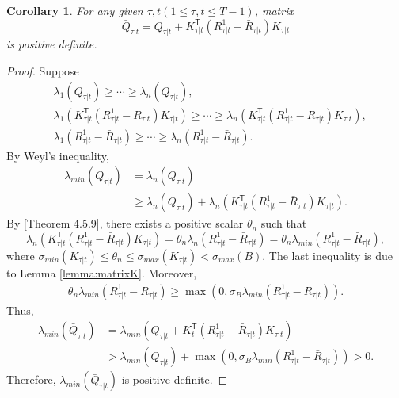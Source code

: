 \documentclass{article}
\newcommand{\transpose}{\mathsf{T}}
\newtheorem{corollary}{Corollary}
\begin{document}
\begin{corollary}
    For any given $\tau,t(1\leq \tau, t \leq T-1)$, matrix
    \begin{equation}
        \bar{Q}_{\tau|t} = Q_{\tau|t} + K_{\tau|t}^{\transpose}(R_{\tau|t}^{1} - \bar{R}_{\tau|t})K_{\tau|t}
    \end{equation}
    is positive definite.
\end{corollary}
\begin{proof}
    Suppose
    \begin{align*}
        &\lambda_{1}(Q_{\tau|t}) \geq \cdots \geq \lambda_{n}(Q_{\tau|t}),\\
        &\lambda_{1}(K_{\tau|t}^{\transpose}(R_{\tau|t}^{1} - \bar{R}_{\tau|t})K_{\tau|t}) \geq \cdots \geq \lambda_{n}(K_{\tau|t}^{\transpose}(R_{\tau|t}^{1} - \bar{R}_{\tau|t})K_{\tau|t}),\\
        &\lambda_{1}(R_{\tau|t}^{1} - \bar{R}_{\tau|t}) \geq \cdots \geq \lambda_{n}(R_{\tau|t}^{1} - \bar{R}_{\tau|t}).
    \end{align*}
    By Weyl's inequality,
    \begin{align*}
        \lambda_{min}(\bar{Q}_{\tau|t}) &= \lambda_{n}(\bar{Q}_{\tau|t})\\
        &\geq \lambda_{n}(Q_{\tau|t}) + \lambda_{n}(K_{\tau|t}^{\transpose}(R_{\tau|t}^{1} - \bar{R}_{\tau|t})K_{\tau|t}).
    \end{align*}
    By \cite{horn_matrix_2013}[Theorem 4.5.9], there exists a positive scalar $\theta_{n}$ such that
    \begin{equation}
        \lambda_{n}(K_{\tau|t}^{\transpose}(R_{\tau|t}^{1} - \bar{R}_{\tau|t})K_{\tau|t}) = \theta_{n}\lambda_{n}(R_{\tau|t}^{1} - \bar{R}_{\tau|t}) = \theta_{n}\lambda_{min}(R_{\tau|t}^{1} - \bar{R}_{\tau|t}),
    \end{equation}
    where $\sigma_{min}(K_{\tau|t}) \leq \theta_{n} \leq \sigma_{max}(K_{\tau|t}) < \sigma_{max}(B)$.
    The last inequality is due to Lemma \ref{lemma:matrixK}. Moreover,
    \begin{align*}
        \theta_{n}\lambda_{min}(R_{\tau|t}^{1} - \bar{R}_{\tau|t}) \geq \max(0,\sigma_{B}\lambda_{min}(R_{\tau|t}^{1} - \bar{R}_{\tau|t})).
    \end{align*}
    Thus, 
    \begin{align*}
        \lambda_{min}(\bar{Q}_{\tau|t}) &= \lambda_{min}(Q_{\tau|t}+K_{t}^{\transpose}(R_{\tau|t}^{1}-\bar{R}_{\tau|t})K_{\tau|t}) \\
        &> \lambda_{min}(Q_{\tau|t}) +\max(0,\sigma_{B}\lambda_{min}(R_{\tau|t}^{1} - \bar{R}_{\tau|t})) > 0.
    \end{align*}
    Therefore, $\lambda_{min}(\bar{Q}_{\tau|t})$ is positive definite.
\end{proof}
\end{document}
